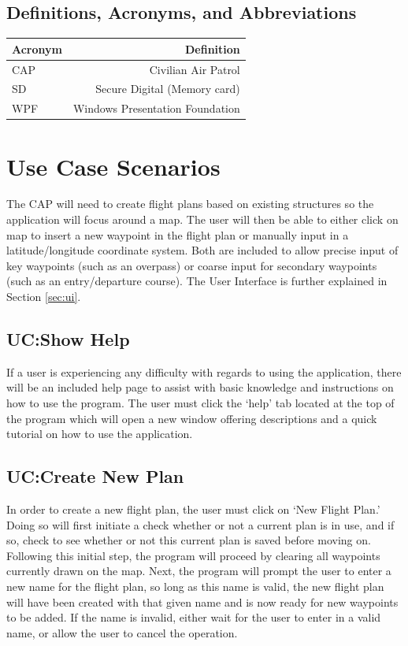 \documentclass[12pt, letterpaper]{article}
\begin{document}
\subsection{Definitions, Acronyms, and Abbreviations}
\begin{tabularx}{\textwidth}{|l|R|} \hline
  Acronym & Definition \\ \hline
  CAP & Civilian Air Patrol  \\ \hline
  SD & Secure Digital (Memory card) \\ \hline
  WPF & Windows Presentation Foundation \\ \hline
\end{tabularx}

\newpage
\section{Use Case Scenarios}\label{system}
The CAP will need to create flight plans based on existing structures so the application will focus around a map.
The user will then be able to either click on map to insert a new waypoint in the flight plan or manually input in a latitude/longitude coordinate system.
Both are included to allow precise input of key waypoints (such as an overpass) or coarse input for secondary waypoints (such as an entry/departure course).
The User Interface is further explained in Section \ref{sec:ui}.


\subsection{UC:Show Help}
If a user is experiencing any difficulty with regards to using the application, there will be an included help page to assist with basic knowledge and instructions on how to use the program.
The user must click the `help' tab located at the top of the program which will open a new window offering descriptions and a quick tutorial on how to use the application.

\clearpage
\subsection{UC:Create New Plan}\label{newplan}
In order to create a new flight plan, the user must click on `New Flight Plan.'
Doing so will first initiate a check whether or not a current plan is in use, and if so, check to see whether or not this current plan is saved before moving on.
Following this initial step, the program will proceed by clearing all waypoints currently drawn on the map.
Next, the program will prompt the user to enter a new name for the flight plan, so long as this name is valid, the new flight plan will have been created with that given name and is now ready for new waypoints to be added.
If the name is invalid, either wait for the user to enter in a valid name, or allow the user to cancel the operation.
\end{document}
